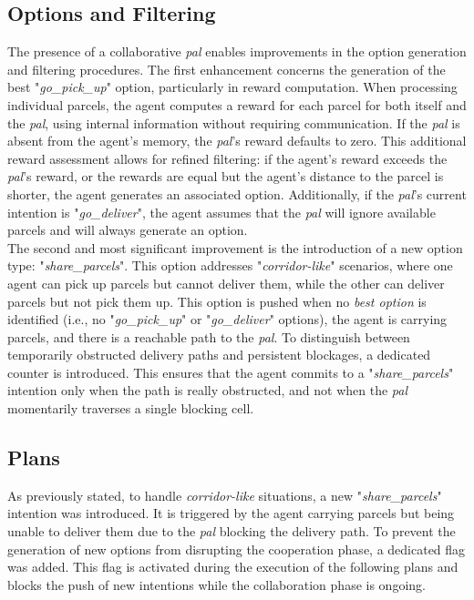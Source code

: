     \subsection{Options and Filtering}
        The presence of a collaborative \textit{pal} enables improvements in the option generation and filtering procedures. The first enhancement concerns the generation of the best "\textit{go\_pick\_up}" option, particularly in reward computation. When processing individual parcels, the agent computes a reward for each parcel for both itself and the \textit{pal}, using internal information without requiring communication. If the \textit{pal} is absent from the agent's memory, the \textit{pal}'s reward defaults to zero. This additional reward assessment allows for refined filtering: if the agent's reward exceeds the \textit{pal}'s reward, or the rewards are equal but the agent's distance to the parcel is shorter, the agent generates an associated option. Additionally, if the \textit{pal}'s current intention is "\textit{go\_deliver}", the agent assumes that the \textit{pal} will ignore available parcels and will always generate an option.
        \medskip\\
        The second and most significant improvement is the introduction of a new option type: "\textit{share\_parcels}". This option addresses "\textit{corridor-like}" scenarios, where one agent can pick up parcels but cannot deliver them, while the other can deliver parcels but not pick them up. This option is pushed when no \textit{best option} is identified (i.e., no "\textit{go\_pick\_up}" or "\textit{go\_deliver}" options), the agent is carrying parcels, and there is a reachable path to the \textit{pal}. To distinguish between temporarily obstructed delivery paths and persistent blockages, a dedicated counter is introduced. This ensures that the agent commits to a "\textit{share\_parcels}" intention only when the path is really obstructed, and not when the \textit{pal} momentarily traverses a single blocking cell.
    
    \subsection{Plans}\label{shareRequest}
        As previously stated, to handle \textit{corridor-like} situations, a new "\textit{share\_parcels}" intention was introduced. It is triggered by the agent carrying parcels but being unable to deliver them due to the \textit{pal} blocking the delivery path. To prevent the generation of new options from disrupting the cooperation phase, a dedicated flag was added. This flag is activated during the execution of the following plans and blocks the push of new intentions while the collaboration phase is ongoing.

